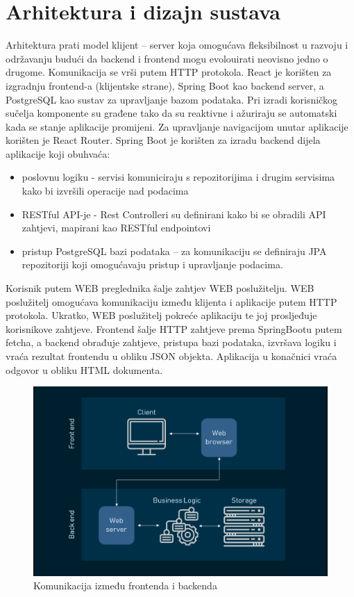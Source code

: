 \chapter{Arhitektura i dizajn sustava}
		
		
	\noindent Arhitektura prati model klijent – server koja omogućava fleksibilnost u razvoju i održavanju budući da backend i frontend mogu evolouirati neovisno jedno o drugome. Komunikacija se vrši putem HTTP protokola.
	React je korišten za izgradnju frontend-a (klijentske strane), Spring Boot kao backend server, a PostgreSQL kao sustav za upravljanje bazom podataka. Pri izradi korisničkog sučelja komponente su građene tako da su reaktivne i ažuriraju se automatski kada se stanje aplikacije promijeni. Za upravljanje navigacijom unutar aplikacije korišten je React Router.
	Spring Boot je korišten za izradu backend dijela aplikacije koji obuhvaća:
	
	\begin{itemize}
		\item poslovnu logiku - servisi komuniciraju s repozitorijima i drugim servisima kako bi izvršili operacije nad podacima
		\item RESTful API-je - Rest Controlleri su definirani kako bi se obradili API zahtjevi, mapirani kao RESTful endpointovi
		\item pristup PostgreSQL bazi podataka – za komunikaciju se definiraju JPA repozitoriji koji omogućavaju pristup i upravljanje podacima.
	\end{itemize}
	
	
	Korisnik putem WEB preglednika šalje zahtjev WEB poslužitelju. WEB poslužitelj omogućava komunikaciju između klijenta i aplikacije putem HTTP protokola. Ukratko, WEB poslužitelj pokreće aplikaciju te joj prosljeđuje korisnikove zahtjeve. Frontend šalje HTTP zahtjeve prema SpringBootu putem fetcha, a backend obrađuje zahtjeve, pristupa bazi podataka, izvršava logiku i vraća rezultat frontendu u obliku JSON objekta.  Aplikacija u konačnici vraća odgovor u obliku HTML dokumenta.
	
		\begin{figure}[H]
		\includegraphics[scale=0.5]{slike/komunikacija.png} %
		\centering
		\caption{Komunikacija između frontenda i backenda}
		\label{fig:komunikacija} %
		\end{figure}
	
